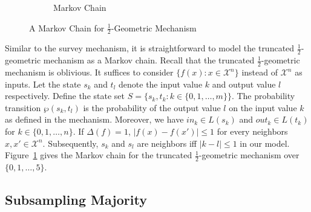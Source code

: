 \begin{figure}[tbh]
\begin{subfigure}{.50\columnwidth}
{
    }
    \caption{Markov Chain}
    \label{figure:geometric-mechanism-markov-chain}
  \end{subfigure}
  \caption{A Markov Chain for $\frac{1}{2}$-Geometric Mechanism}
  \label{figure:geometric-mechanism}\vspace*{-.5cm}
\end{figure}

Similar to the survey mechanism, it is straightforward to model the
truncated $\frac{1}{2}$-geometric mechanism as a Markov chain. 
Recall that the truncated $\frac{1}{2}$-geometric mechanism is
oblivious. It suffices to consider $\{ f (x) : x \in \mathcal{X}^n \}$
instead of $\mathcal{X}^n$ as inputs. 
Let the state $s_k$ and $t_l$
denote the input value $k$ and output value $l$ respectively. Define
the state set $S = \{ s_k, t_k : k \in \{ 0, 1, \ldots, m \} \}$.
The probability transition $\wp (s_k, t_l)$ is the probability of the
output value $l$ on the input value $k$ as defined in the
mechanism. Moreover, we have $\mathit{in}_k \in L (s_k)$ and
$\mathit{out}_k \in L (t_k)$ for $k \in \{ 0, 1, \ldots, n \}$.
If $\Delta (f) = 1$, $| f (x) - f (x') | \leq 1$ for every neighbors
$x, x' \in \mathcal{X}^n$. Subsequently, $s_k$ and $s_l$ are
neighbors iff $| k - l | \leq 1$ in our model.
Figure~\ref{figure:geometric-mechanism-markov-chain} gives
the Markov chain for the truncated
$\frac{1}{2}$-geometric mechanism over $\{ 0, 1, \ldots, 5 \}$.

\subsection{Subsampling Majority}
\label{subsection:subsampling}



